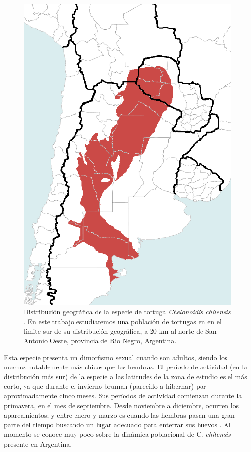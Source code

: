 \begin{figure}[ht]
    \begin{center}
        \includegraphics[width=.7\imsize]{figs/Chap1/Chelonoidis_chilensis_geographic_range.png}
        \caption[Distribución geográfica de la especie de tortuga \textit{Chelonoidis chilensis}.]{Distribución geográfica de la especie de tortuga \textit{Chelonoidis chilensis}
        . En este trabajo estudiaremos una población de tortugas en en el límite sur de su distribución geográfica, a 20 km al norte de San Antonio Oeste, provincia de Río Negro, Argentina.}
        \label{fig:distribuciondeEspecie}
        \end{center}
\end{figure}

Esta especie presenta un dimorfismo sexual cuando son adultos, siendo los machos notablemente más chicos que las hembras. El período de actividad (en la distribución más sur) de la especie a las latitudes de la zona de estudio es el más corto, ya que durante el invierno  bruman (parecido a hibernar) por aproximadamente cinco meses. Sus períodos de actividad comienzan durante la primavera, en el mes de septiembre. Desde noviembre a diciembre, ocurren los apareamientos; y entre enero y marzo es cuando las hembras pasan una gran parte del tiempo buscando un lugar adecuado para enterrar sus huevos \cite{Erika}. Al momento se conoce muy poco sobre la dinámica poblacional de C. \textit{chilensis} presente en Argentina.
 
